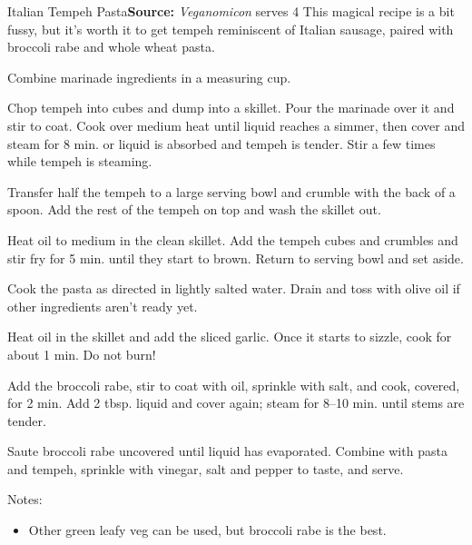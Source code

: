 \begin{recipe}{Italian Tempeh Pasta}{}{\textbf{Source:} \textit{Veganomicon} \hfill serves 4}
  \freeform This magical recipe is a bit fussy, but it's worth it to get tempeh reminiscent of Italian sausage, paired with broccoli rabe and whole wheat pasta.

Combine marinade ingredients in a measuring cup.

Chop tempeh into cubes and dump into a skillet. Pour the marinade over it and stir to coat. Cook over medium heat until liquid reaches a simmer, then cover and steam for 8 min. or liquid is absorbed and tempeh is tender. Stir a few times while tempeh is steaming.

\newstep Transfer half the tempeh to a large serving bowl and crumble with the back of a spoon. Add the rest of the tempeh on top and wash the skillet out.

Heat oil to medium in the clean skillet. Add the tempeh cubes and crumbles and stir fry for 5 min. until they start to brown. Return to serving bowl and set aside.

Cook the pasta as directed in lightly salted water. Drain and toss with olive oil if other ingredients aren't ready yet.

Heat oil in the skillet and add the sliced garlic. Once it starts to sizzle, cook for about 1 min. Do not burn!

Add the broccoli rabe, stir to coat with oil, sprinkle with salt, and cook, covered, for 2 min. Add 2 tbsp. liquid and cover again; steam for 8--10 min. until stems are tender.

Saute broccoli rabe uncovered until liquid has evaporated. Combine with pasta and tempeh, sprinkle with vinegar, salt and pepper to taste, and serve.

\freeform Notes:
\begin{itemize}
  \item Other green leafy veg can be used, but broccoli rabe is the best.
\end{itemize}
\end{recipe}